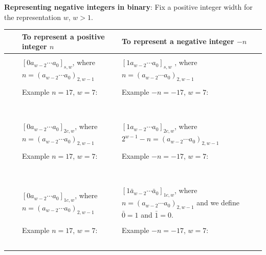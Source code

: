 \documentclass[12pt, oneside]{article}
\begin{document}
{\bf Representing negative integers in binary}: Fix a positive integer  width for the representation  $w$, $w >1$.

\begin{tabular}{|cc|p{3.4in}|p{3.7in}|}
\hline
& & To  represent a positive integer $n$ & To represent a negative integer $-n$\\
\hline
&& &  \\
&\parbox[t]{2mm}{} &
$[ 0a_{w-2} \cdots a_0]_{s,w}$, where $n =  (a_{w-2} \cdots a_0)_{2,w-1}$& 
$[1a_{w-2} \cdots a_0]_{s,w}$
, where $n =  (a_{w-2} \cdots a_0)_{2,w-1}$\\
&& & \\
&& Example $n=17$, $w=7$:  & Example $-n=-17$, $w=7$: \\
&& & \\
&& & \\
&& & \\
&& & \\
&& & \\
&& & \\
&& & \\
\hline
&&  &  \\
&\parbox[t]{2mm}{} &
$[0a_{w-2} \cdots a_0]_{2c,w}$, where $n =  (a_{w-2} \cdots a_0)_{2,w-1}$& $[1a_{w-2} \cdots a_0]_{2c,w}$, where $2^{w-1} - n =  (a_{w-2} \cdots a_0)_{2,w-1}$\\
&& & \\
&& Example $n=17$, $w=7$:  & Example $-n=-17$, $w=7$: \\
&& & \\
&& & \\
&& & \\
&& & \\
&& & \\
&& & \\
&& & \\
\hline
&&  &  \\
\parbox[t]{1.5mm}{} 
& \parbox[t]{2mm}{} &
$[0a_{w-2} \cdots a_0]_{1c,w}$, where $n =  (a_{w-2} \cdots a_0)_{2,w-1}$& $[1\bar{a}_{w-2} \cdots \bar{a}_0]_{1c,w}$, where $n =  (a_{w-2} \cdots a_0)_{2,w-1}$ and we define  $\bar{0} = 1$ and $\bar{1} = 0$.\\
&& & \\
&& Example $n=17$, $w=7$:  & Example $-n=-17$, $w=7$: \\
&& & \\
&& & \\
&& & \\
&& & \\
&& & \\
\hline
\end{tabular} \vfill
\end{document}
